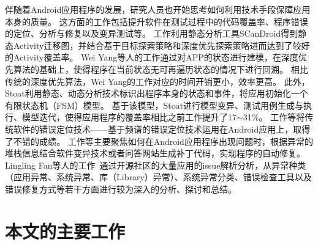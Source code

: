 伴随着Android应用程序的发展，研究人员也开始思考如何利用技术手段保障应用本身的质量。
这方面的工作包括提升软件在测试过程中的代码覆盖率\cite{azim2013targeted,yang2013grey,su2016fsmdroid,androidtest2}、程序错误的定位、分析与修复\cite{mirzaei2015exception,machado2013mzoltar,tan2018repairing,QingGaoASE15}以及变异测试\cite{MutationOperatorsAndroid,deng2015towards,linares2017enabling}等。
工作\cite{azim2013targeted}利用静态分析工具SCanDroid得到静态Activity迁移图，并结合基于目标探索策略和深度优先探索策略进而达到了较好的Activity覆盖率。
Wei Yang等人的工作\cite{yang2013grey}通过对APP的状态进行建模，在深度优先算法的基础上，使得程序在当前状态无可再遍历状态的情况下进行回溯。
相比传统的深度优先算法，Wei Yang的工作对应的时间开销更小，效率更高。
此外，Stoat\cite{su2016fsmdroid,androidtest2}利用静态、动态分析技术标识出程序本身的状态和事件，将应用初始化一个有限状态机（FSM）模型。
基于该模型，Stoat进行模型变异、测试用例生成与执行、模型迭代，使得应用程序的覆盖率相比之前工作\cite{hao2014puma,amalfitano2015mobiguitar}提升了17$\sim$31\%。
工作\cite{mirzaei2015exception,machado2013mzoltar}等将传统软件的错误定位技术——基于频谱的错误定位技术运用在Android应用上，取得了不错的成绩。
工作\cite{tan2018repairing,QingGaoASE15}等主要聚焦如何在Android应用程序出现问题时，根据异常的堆栈信息结合软件变异技术或者问答网站生成补丁代码，实现程序的自动修复。
Lingling Fan等人的工作~\cite{fan2018large}通过开源社区的大量应用的issue解析分析，从异常种类（应用异常、系统异常、库（Library）异常）、系统异常分类、错误检查工具以及错误修复方式等若干方面进行较为深入的分析、探讨和总结。




\section{本文的主要工作}

